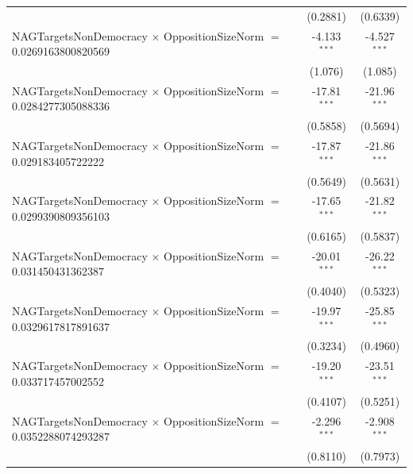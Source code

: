 \begin{tabular}{lcc}
                                                                                & (0.2881)             & (0.6339)\\   
   NAGTargetsNonDemocracy $\times$ OppositionSizeNorm $=$ 0.0269163800820569    & -4.133$^{***}$       & -4.527$^{***}$\\   
                                                                                & (1.076)              & (1.085)\\   
   NAGTargetsNonDemocracy $\times$ OppositionSizeNorm $=$ 0.0284277305088336    & -17.81$^{***}$       & -21.96$^{***}$\\   
                                                                                & (0.5858)             & (0.5694)\\   
   NAGTargetsNonDemocracy $\times$ OppositionSizeNorm $=$ 0.029183405722222     & -17.87$^{***}$       & -21.86$^{***}$\\   
                                                                                & (0.5649)             & (0.5631)\\   
   NAGTargetsNonDemocracy $\times$ OppositionSizeNorm $=$ 0.0299390809356103    & -17.65$^{***}$       & -21.82$^{***}$\\   
                                                                                & (0.6165)             & (0.5837)\\   
   NAGTargetsNonDemocracy $\times$ OppositionSizeNorm $=$ 0.031450431362387     & -20.01$^{***}$       & -26.22$^{***}$\\   
                                                                                & (0.4040)             & (0.5323)\\   
   NAGTargetsNonDemocracy $\times$ OppositionSizeNorm $=$ 0.0329617817891637    & -19.97$^{***}$       & -25.85$^{***}$\\   
                                                                                & (0.3234)             & (0.4960)\\   
   NAGTargetsNonDemocracy $\times$ OppositionSizeNorm $=$ 0.033717457002552     & -19.20$^{***}$       & -23.51$^{***}$\\   
                                                                                & (0.4107)             & (0.5251)\\   
   NAGTargetsNonDemocracy $\times$ OppositionSizeNorm $=$ 0.0352288074293287    & -2.296$^{***}$       & -2.908$^{***}$\\   
                                                                                & (0.8110)             & (0.7973)\\   

\end{tabular}
